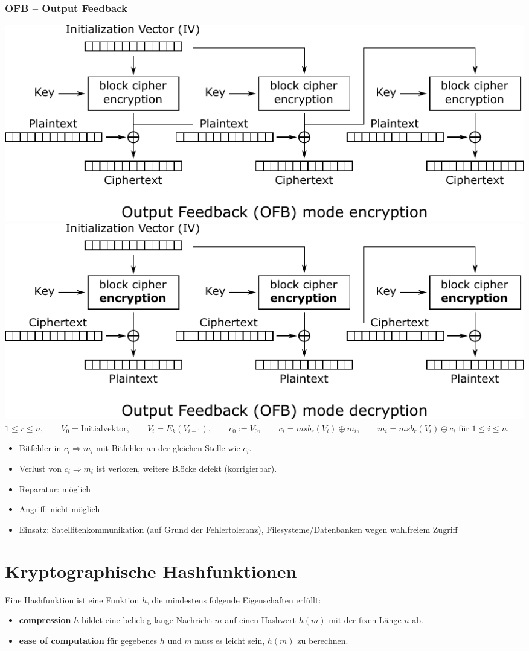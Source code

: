 \documentclass[8pt,a4paper,landscape]{article}
\begin{document}
\begin{multicols}{4}
\subsubsection{OFB – Output Feedback}
\includegraphics[width=\columnwidth]{OFB_encryption.pdf}
\includegraphics[width=\columnwidth]{OFB_decryption.pdf}
\(1 \leq r \leq n, \qquad V_0=\textrm{Initialvektor}, \qquad V_i=E_k(V_{i-1}), \qquad c_0 := V_0, \qquad c_i =msb_r(V_i) \oplus m_i, \qquad m_i =msb_r(V_i) \oplus c_i \) für \(1\leq i \leq n\).
\begin{itemize}[itemsep=1pt]
\item Bitfehler in \(c_i \Rightarrow m_i \) mit Bitfehler an der gleichen Stelle wie \(c_i\).
\item Verlust von \(c_i \Rightarrow m_i \) ist verloren, weitere Blöcke defekt (korrigierbar).
\item Reparatur: möglich
\item Angriff: nicht möglich
\item Einsatz: Satellitenkommunikation (auf Grund der Fehlertoleranz), Filesysteme/Datenbanken wegen wahlfreiem Zugriff
\end{itemize}

\section{Kryptographische Hashfunktionen}
Eine Hashfunktion ist eine Funktion $h$, die mindestens folgende Eigenschaften erfüllt: \begin{itemize}
 \item \textbf{compression} $h$ bildet eine beliebig lange Nachricht $m$ auf einen Hashwert $h(m)$ mit der fixen Länge $n$ ab.
 \item \textbf{ease of computation} für gegebenes $h$ und $m$ muss es leicht sein, $h(m)$ zu berechnen.
 \end{itemize}


\end{multicols}
\end{document}
